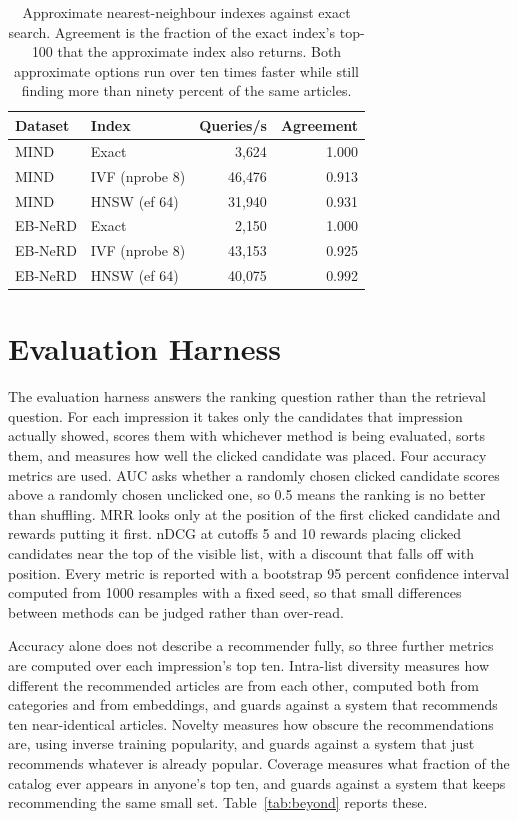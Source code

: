 \documentclass[11pt]{article}
\begin{document}
\begin{table}[t]
\centering
\small
\begin{tabular}{llrr}
\toprule
Dataset & Index & Queries/s & Agreement \\
\midrule
MIND    & Exact          &  3{,}624 & 1.000 \\
MIND    & IVF (nprobe 8) & 46{,}476 & 0.913 \\
MIND    & HNSW (ef 64)   & 31{,}940 & 0.931 \\
\midrule
EB-NeRD & Exact          &  2{,}150 & 1.000 \\
EB-NeRD & IVF (nprobe 8) & 43{,}153 & 0.925 \\
EB-NeRD & HNSW (ef 64)   & 40{,}075 & 0.992 \\
\bottomrule
\end{tabular}
\caption{Approximate nearest-neighbour indexes against exact search. Agreement is the fraction
of the exact index's top-100 that the approximate index also returns. Both approximate options
run over ten times faster while still finding more than ninety percent of the same articles.}
\label{tab:ann}
\end{table}

\section{Evaluation Harness}
\label{sec:eval}

The evaluation harness answers the ranking question rather than the retrieval question. For
each impression it takes only the candidates that impression actually showed, scores them with
whichever method is being evaluated, sorts them, and measures how well the clicked candidate
was placed. Four accuracy metrics are used. AUC asks whether a randomly chosen clicked
candidate scores above a randomly chosen unclicked one, so 0.5 means the ranking is no better
than shuffling. MRR looks only at the position of the first clicked candidate and rewards
putting it first. nDCG at cutoffs 5 and 10 rewards placing clicked candidates near the top of
the visible list, with a discount that falls off with position. Every metric is reported with a
bootstrap 95 percent confidence interval computed from 1000 resamples with a fixed seed, so
that small differences between methods can be judged rather than over-read.

Accuracy alone does not describe a recommender fully, so three further metrics are computed
over each impression's top ten. Intra-list diversity measures how different the recommended
articles are from each other, computed both from categories and from embeddings, and guards
against a system that recommends ten near-identical articles. Novelty measures how obscure the
recommendations are, using inverse training popularity, and guards against a system that just
recommends whatever is already popular. Coverage measures what fraction of the catalog ever
appears in anyone's top ten, and guards against a system that keeps recommending the same small
set. Table~\ref{tab:beyond} reports these.
\end{document}
